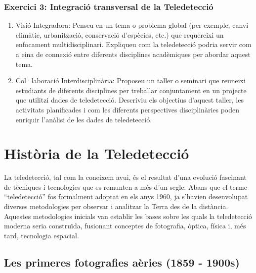 \documentclass[
]{book}
\providecommand{\tightlist}{%
  \setlength{\itemsep}{0pt}\setlength{\parskip}{0pt}}
\begin{document}
\hypertarget{exercici-3-integraciuxf3-transversal-de-la-teledetecciuxf3}{%
\subsection*{Exercici 3: Integració transversal de la Teledetecció}\label{exercici-3-integraciuxf3-transversal-de-la-teledetecciuxf3}}

\begin{enumerate}
\def\labelenumi{\arabic{enumi}.}
\tightlist
\item
  Visió Integradora: Penseu en un tema o problema global (per exemple, canvi climàtic, urbanització, conservació d'espècies, etc.) que requereixi un enfocament multidisciplinari. Expliqueu com la teledetecció podria servir com a eina de connexió entre diferents disciplines acadèmiques per abordar aquest tema.
\item
  Col·laboració Interdisciplinària: Proposeu un taller o seminari que reuneixi estudiants de diferents disciplines per treballar conjuntament en un projecte que utilitzi dades de teledetecció. Descriviu els objectius d'aquest taller, les activitats planificades i com les diferents perspectives disciplinàries poden enriquir l'anàlisi de les dades de teledetecció.
\end{enumerate}

\hypertarget{history}{%
\chapter{Història de la Teledetecció}\label{history}}

La teledetecció, tal com la coneixem avui, és el resultat d'una evolució fascinant de tècniques i tecnologies que es remunten a més d'un segle. Abans que el terme ``teledetecció'' fos formalment adoptat en els anys 1960, ja s'havien desenvolupat diverses metodologies per observar i analitzar la Terra des de la distància. Aquestes metodologies inicials van establir les bases sobre les quals la teledetecció moderna seria construïda, fusionant conceptes de fotografia, òptica, física i, més tard, tecnologia espacial.

\hypertarget{les-primeres-fotografies-auxe8ries-1859---1900s}{%
\section{Les primeres fotografies aèries (1859 - 1900s)}\label{les-primeres-fotografies-auxe8ries-1859---1900s}}
\end{document}
